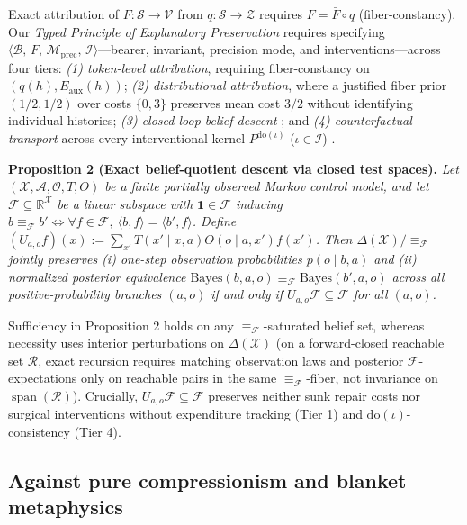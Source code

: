 \documentclass[11pt,letterpaper]{article}
\begin{document}
Exact attribution of \(F: \mathcal{S} \to \mathcal{V}\) from
\(q: \mathcal{S} \to \mathcal{Z}\) requires \(F = \bar{F} \circ q\)
(fiber-constancy). Our \emph{Typed Principle of Explanatory
Preservation} requires specifying
\(\langle \mathcal{B},\, F,\, \mathcal{M}_{\mathrm{prec}},\, \mathcal{I}\rangle\)---bearer,
invariant, precision mode, and interventions---across four tiers:
\emph{(1) token-level attribution}, requiring fiber-constancy on
\((q(h), E_{\mathrm{aux}}(h))\); \emph{(2) distributional attribution},
where a justified fiber prior \((1/2, 1/2)\) over costs \(\{0,3\}\)
preserves mean cost \(3/2\) without identifying individual histories;
\emph{(3) closed-loop belief descent}
\citep{burkeRosenblatt1958, kemenySnell1960, poupartBoutilier2003, givanDeanGreig2003};
and \emph{(4) counterfactual transport} across every interventional
kernel \(P^{\mathrm{do}(\iota)}\) (\(\iota \in \mathcal{I}\))
\citep{woodward2000, rubenstein2017}.

\textbf{Proposition 2 (Exact belief-quotient descent via closed test
spaces).} \emph{Let \((\mathcal{X}, \mathcal{A}, \mathcal{O}, T, O)\) be
a finite partially observed Markov control model, and let
\(\mathcal{F} \subseteq \mathbb{R}^{\mathcal{X}}\) be a linear subspace
with \(\mathbf{1} \in \mathcal{F}\) inducing
\(b \equiv_{\mathcal{F}} b' \iff \forall f \in \mathcal{F},\ \langle b, f\rangle = \langle b', f\rangle\).
Define
\((U_{a,o} f)(x) := \sum_{x'} T(x' \mid x, a) O(o \mid a, x') f(x')\).
Then \(\Delta(\mathcal{X})/{\equiv_{\mathcal{F}}}\) jointly preserves
(i) one-step observation probabilities \(p(o \mid b, a)\) and (ii)
normalized posterior equivalence
\(\mathrm{Bayes}(b,a,o) \equiv_{\mathcal{F}} \mathrm{Bayes}(b',a,o)\)
across all positive-probability branches \((a,o)\) if and only if
\(U_{a,o}\mathcal{F} \subseteq \mathcal{F}\) for all \((a,o)\).}

Sufficiency in Proposition 2 holds on any
\(\equiv_{\mathcal{F}}\)-saturated belief set, whereas necessity uses
interior perturbations on \(\Delta(\mathcal{X})\) (on a forward-closed
reachable set \(\mathcal{R}\), exact recursion requires matching
observation laws and posterior \(\mathcal{F}\)-expectations only on
reachable pairs in the same \(\equiv_{\mathcal{F}}\)-fiber, not
invariance on \(\operatorname{span}(\mathcal{R})\)). Crucially,
\(U_{a,o}\mathcal{F} \subseteq \mathcal{F}\) preserves neither sunk
repair costs nor surgical interventions without expenditure tracking
(Tier 1) and \(\mathrm{do}(\iota)\)-consistency (Tier 4).

\subsection{Against pure compressionism and blanket
metaphysics}\label{against-pure-compressionism-and-blanket-metaphysics}
\end{document}
